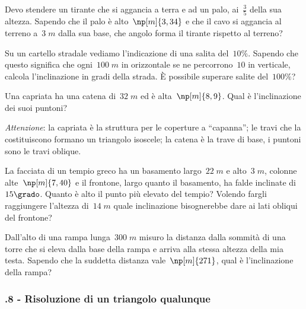 \begin{multicols}{2}
\begin{esercizio}[\Ast]
\label{ese:G.63}
Devo stendere un tirante che si aggancia a terra e ad un palo, ai~$\frac{3}{5}$ della sua altezza.
Sapendo che il palo è alto~$\np[m]{3,34}$ e che il cavo si aggancia al terreno a~$3\;\unit{m}$ dalla sua base,
che angolo forma il tirante rispetto al terreno?
\end{esercizio}

\begin{esercizio}[\Ast]
\label{ese:G.64}
Su un cartello stradale vediamo l'indicazione di una salita del~$10\%$. Sapendo che questo significa che ogni~$100\;\unit{m}$
in orizzontale se ne percorrono~$10$ in verticale, calcola l'inclinazione in gradi della strada. È possibile superare salite del~$100\%$?
\end{esercizio}

\begin{esercizio}[\Ast]
\label{ese:G.65}
Una capriata ha una catena di~$32\;\unit{m}$ ed è alta~$\np[m]{8,9}$. Qual è l'inclinazione dei suoi puntoni?

\emph{Attenzione}: la capriata è la struttura per le coperture a ``capanna''; le travi che la costituiscono
formano un triangolo isoscele; la catena è la trave di base, i puntoni sono le travi oblique.
\end{esercizio}

\begin{esercizio}[\Ast]
\label{ese:G.66}
La facciata di un tempio greco ha un basamento largo~$22\;\unit{m}$ e alto~$3\;\unit{m}$, colonne alte~$\np[m]{7,40}$ e il frontone,
largo quanto il basamento, ha falde inclinate di~$15\grado$. Quanto è alto il punto più elevato del tempio?
Volendo fargli raggiungere l'altezza di~$14\;\unit{m}$ quale inclinazione bisognerebbe dare ai lati obliqui del frontone?
\end{esercizio}

\begin{esercizio}[\Ast]
\label{ese:G.67}
Dall'alto di una rampa lunga~$300\;\unit{m}$ misuro la distanza dalla sommità di una torre che si eleva dalla base della rampa e arriva
alla stessa altezza della mia testa. Sapendo che la suddetta distanza vale~$\np[m]{271}$, qual è l'inclinazione della rampa?
\end{esercizio}
\end{multicols}

\subsubsection*{\thechapter.8 - Risoluzione di un triangolo qualunque}


